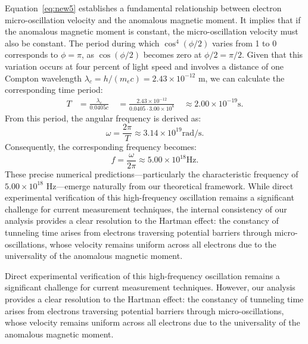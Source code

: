 \documentclass[%
 reprint,
 amsmath,amssymb,
 aps,
]{revtex4-1}
\numberwithin{equation}{section}%
\begin{document}
Equation~\ref{eq:new5} establishes a fundamental relationship between electron micro-oscillation velocity and the anomalous magnetic moment. It implies that if the anomalous magnetic moment is constant, the micro-oscillation velocity must also be constant. The period during which $\cos^4(\phi/2)$ varies from 1 to 0 corresponds to $\phi = \pi$, as $\cos(\phi/2)$ becomes zero at $\phi/2 = \pi/2$. Given that this variation occurs at four percent of light speed and involves a distance of one Compton wavelength $\lambda_c = h/(m_ec) = 2.43 \times 10^{-12}$ m, we can calculate the corresponding time period:
\begin{equation}
\begin{aligned}
T &= \frac{\lambda_c}{0.0405c} \
&= \frac{2.43 \times 10^{-12}}{0.0405 \cdot 3.00 \times 10^8} \
&\approx 2.00 \times 10^{-19} \mathrm{s}.
\label{eq:period}
\end{aligned}
\end{equation}
From this period, the angular frequency is derived as:
\begin{equation}
\omega = \frac{2\pi}{T} \approx 3.14 \times 10^{19} \mathrm{rad/s}.
\label{eq:frequency}
\end{equation}
Consequently, the corresponding frequency becomes:
\begin{equation}
f = \frac{\omega}{2\pi} \approx 5.00 \times 10^{18} \mathrm{Hz}.
\label{eq:natural_frequency}
\end{equation}
These precise numerical predictions---particularly the characteristic frequency of $5.00 \times 10^{18}$ Hz---emerge naturally from our theoretical framework. While direct experimental verification of this high-frequency oscillation remains a significant challenge for current measurement techniques, the internal consistency of our analysis provides a clear resolution to the Hartman effect: the constancy of tunneling time arises from electrons traversing potential barriers through micro-oscillations, whose velocity remains uniform across all electrons due to the universality of the anomalous magnetic moment.

Direct experimental verification of this high-frequency oscillation remains a significant challenge for current measurement techniques. However, our analysis provides a clear resolution to the Hartman effect: the constancy of tunneling time arises from electrons traversing potential barriers through micro-oscillations, whose velocity remains uniform across all electrons due to the universality of the anomalous magnetic moment.
\end{document}
